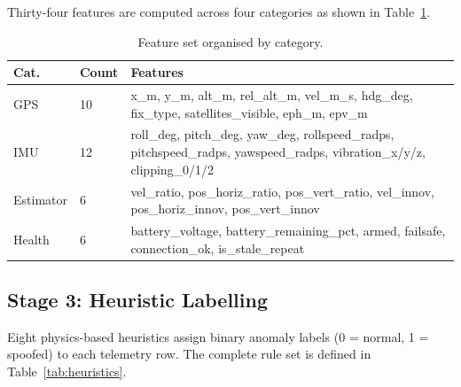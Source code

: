 Thirty-four features are computed across four categories as shown in Table~\ref{tab:features}.

\begin{table}[H]
\centering
\caption{Feature set organised by category.}
\label{tab:features}
\small
\begin{tabular}{@{}llp{7cm}@{}}
\toprule
\textbf{Cat.} & \textbf{Count} & \textbf{Features} \\
\midrule
GPS          & 10 & x\_m, y\_m, alt\_m, rel\_alt\_m, vel\_m\_s, hdg\_deg, fix\_type, satellites\_visible, eph\_m, epv\_m \\
IMU          & 12 & roll\_deg, pitch\_deg, yaw\_deg, rollspeed\_radps, pitchspeed\_radps, yawspeed\_radps, vibration\_x/y/z, clipping\_0/1/2 \\
Estimator    & 6  & vel\_ratio, pos\_horiz\_ratio, pos\_vert\_ratio, vel\_innov, pos\_horiz\_innov, pos\_vert\_innov \\
Health       & 6  & battery\_voltage, battery\_remaining\_pct, armed, failsafe, connection\_ok, is\_stale\_repeat \\
\bottomrule
\end{tabular}
\end{table}

\subsection{Stage 3: Heuristic Labelling}\label{sec:heuristics}

Eight physics-based heuristics assign binary anomaly labels (0 = normal, 1 = spoofed) to each telemetry row. The complete rule set is defined in Table~\ref{tab:heuristics}.

